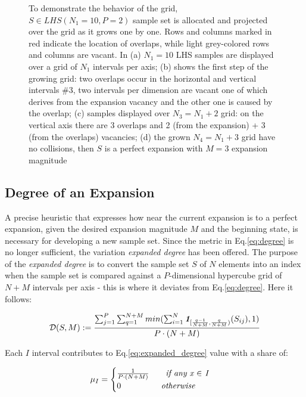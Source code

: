 \documentclass[12pt]{extarticle}
\newcommand{\meqref}[1]{Eq.\ref{#1}}
\newcommand{\indfunc}[1]{\textit{\textbf{1}}_{#1}}
\begin{document}
\begin{figure}[]
    \caption{To demonstrate the behavior of the grid, $S \in LHS(N_1 = 10, P = 2)$ sample set is allocated and projected over the grid as it grows one by one. Rows and columns marked in red indicate the location of overlaps, while light grey-colored rows and columns are vacant. In (a) $N_1 = 10$ LHS samples are displayed over a grid of $N_1$ intervals per axis; (b) shows the first step of the growing grid: two overlaps occur in the horizontal and vertical intervals \#3, two intervals per dimension are vacant one of which derives from the expansion vacancy and the other one is caused by the overlap; (c) samples displayed over $N_3 = N_1 + 2$ grid: on the vertical axis there are 3 overlaps and 2 (from the expansion) + 3 (from the overlaps) vacancies; (d) the grown $N_4 = N_1 + 3$ grid have no collisions, then $S$ is a perfect expansion with $M = 3$ expansion magnitude}
    \label{fig:example_overlaps}
\end{figure}


\subsection{Degree of an Expansion}
\label{subsec:expansion_degree}
A precise heuristic that expresses how near the current expansion is to a perfect expansion, given the desired expansion magnitude $M$ and the beginning state, is necessary for developing a new sample set. Since the metric in \meqref{eq:degree} is no longer sufficient, the variation \textit{expanded degree} has been offered.
The purpose of the \textit{expanded degree} is to convert the sample set $S$ of $N$ elements into an index when the sample set is compared against a $P$-dimensional hypercube grid of $N+M$ intervals per axis - this is where it deviates from \meqref{eq:degree}. Here it follows:

\begin{equation}
\label{eq:expanded_degree}
\mathcal{D}(S, M) := \frac{\sum^P_{j=1}\sum^{N + M}_{q=1} min(\sum^N_{i=1}\indfunc{[\frac{q-1}{N + M}, \frac{q}{N + M})}(S_{ij}), 1)}{P \cdot (N + M)}
\end{equation}

Each $I$ interval contributes to \meqref{eq:expanded_degree} value with a share of:

\begin{equation}
\label{eq:single_contribute_interval}
\mu_I = 
\begin{cases}
\frac{1}{P \cdot (N+M)} \qquad \text{\textit{if any x $\in$ I}}\\
0 \qquad\qquad\;\;\; \text{\textit{otherwise}}
\end{cases}
\end{equation}
\end{document}
